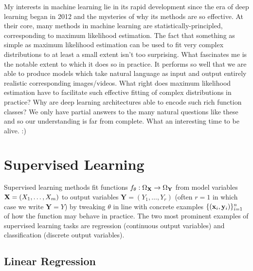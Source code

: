\documentclass[11pt]{article}
\begin{document}
My interests in machine learning lie in its rapid development since the era of deep learning began in 2012 and the mysteries of why its methods are so effective. At their core, many methods in machine learning are statistically-principled, corresponding to maximum likelihood estimation. The fact that something as simple as maximum likelihood estimation can be used to fit very complex distributions to at least a small extent isn't too surprising. What fascinates me is the notable extent to which it does so in practice. It performs so well that we are able to produce models which take natural language as input and output entirely realistic corresponding images/videos. What right does maximum likelihood estimation have to facilitate such effective fitting of complex distributions in practice? Why are deep learning architectures able to encode such rich function classes? We only have partial answers to the many natural questions like these and so our understanding is far from complete. What an interesting time to be alive. :)

\section{Supervised Learning}
Supervised learning methods fit functions $f_{\theta}:\Omega_{\mathbf{X}}\to\Omega_{\mathbf{Y}}$ from model variables $\mathbf{X}=(X_1,\dots,X_m)$ to output variables $\mathbf{Y}=(Y_1,\dots,Y_r)$ (often $r=1$ in which case we write $\mathbf{Y}=Y$) by tweaking $\theta$ in line with concrete examples $\{(\mathbf{x}_i,\mathbf{y}_i)\}_{i=1}^n$ of how the function may behave in practice. The two most prominent examples of supervised learning tasks are regression (continuous output variables) and classification (discrete output variables).

\subsection{Linear Regression}
\end{document}
